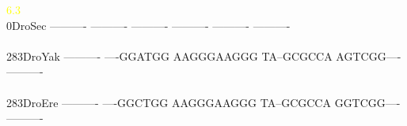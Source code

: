 \documentclass[11pt,twoside,reqno,a4paper]{article}
\begin{document}
{\hspace*{4\charwidth}\hspace*{7\charwidth}\hspace*{1\charwidth}\hspace*{1\charwidth}\hspace*{26\charwidth}\textcolor{yellow}{6.3}\hspace*{1\charwidth}\hspace*{1\charwidth}\hspace*{1\charwidth}\hspace*{1\charwidth}\\
0\hspace*{3\charwidth}DroSec	----------	----------	----------	----------	----------	----------	\\
\hspace*{4\charwidth}\hspace*{7\charwidth}\hspace*{1\charwidth}\hspace*{1\charwidth}\hspace*{1\charwidth}\hspace*{1\charwidth}\hspace*{1\charwidth}\hspace*{1\charwidth}\\
283\hspace*{1\charwidth}DroYak	----------	----GGATGG	AAGGGAAGGG	TA--GCGCCA	AGTCGG----	----------	\\
\hspace*{4\charwidth}\hspace*{7\charwidth}\hspace*{1\charwidth}\hspace*{1\charwidth}\hspace*{1\charwidth}\hspace*{1\charwidth}\hspace*{1\charwidth}\hspace*{1\charwidth}\\
283\hspace*{1\charwidth}DroEre	----------	----GGCTGG	AAGGGAAGGG	TA--GCGCCA	GGTCGG----	----------	\\
\hspace*{4\charwidth}\hspace*{7\charwidth}\hspace*{1\charwidth}\hspace*{1\charwidth}\hspace*{1\charwidth}\hspace*{1\charwidth}\hspace*{1\charwidth}\hspace*{1\charwidth}\\
}
\end{document}
